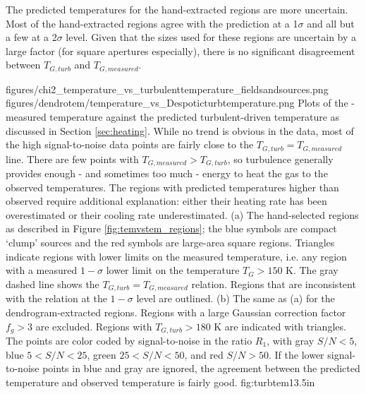 The predicted temperatures for the hand-extracted regions are more uncertain.
Most of the hand-extracted regions agree with the prediction at a 1$\sigma$ and
all but a few at a 2$\sigma$ level.  Given that the sizes used for these
regions are uncertain by a large factor (for square apertures especially), there
is no significant disagreement between $T_{G,turb}$ and $T_{G,measured}$.


\FigureTwo
{figures/chi2_temperature_vs_turbulenttemperature_fieldsandsources.png} %
{figures/dendrotem/temperature_vs_Despoticturbtemperature.png} %
{Plots of the \para-measured temperature against the predicted
turbulent-driven temperature as discussed in Section \ref{sec:heating}.
While no trend is obvious in the data, most of the high signal-to-noise
data points are fairly close to the  $T_{G,turb} = T_{G,measured}$ line.
There are few points with $T_{G,measured} > T_{G,turb}$, so turbulence generally provides
enough - and sometimes too much - energy to heat the gas to the observed temperatures.
The regions with predicted temperatures higher than observed require additional
explanation: either their heating rate has been overestimated or their cooling
rate underestimated.
(a) The hand-selected regions as described in Figure
\ref{fig:temvstem_regions}; the blue symbols are compact `clump' sources and
the red symbols are large-area square regions. 
Triangles indicate regions with lower limits on
the measured temperature, i.e. any region with
a measured $1-\sigma$ lower limit on the temperature $T_G>150$ K.  The gray
dashed line shows the $T_{G,turb} = T_{G,measured}$ relation.  Regions that are inconsistent
with the relation at the $1-\sigma$ level are outlined.
(b) The same as (a) for the dendrogram-extracted regions.  Regions with a large
Gaussian correction factor $f_g>3$ are excluded.  Regions with $T_{G,turb}>180$ K
are indicated with triangles.
The points are color coded by signal-to-noise in the ratio $R_1$, with gray
$S/N < 5$, blue $5 < S/N < 25$, green $25 < S/N < 50$, and red $S/N > 50$. 
If the lower signal-to-noise points in blue and gray are ignored, the agreement
between the predicted temperature and observed temperature is fairly good.
}
{fig:turbtem}{1}{3.5in}

